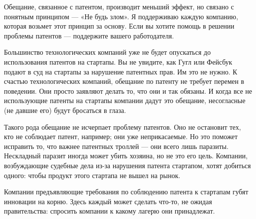 \documentclass[ebook,12pt,oneside,openany]{memoir}
\begin{document}
Обещание, связанное с патентом, производит меньший эффект, но связано
с понятным принципом — «Не будь злом». Я поддерживаю каждую компанию,
которая возьмет этот принцип за основу. Если вы хотите помощь в
решении проблемы патентов — поддержите вашего работодателя.

Большинство технологических компаний уже не будет опускаться до
использования патентов на стартапы. Вы не увидите, как Гугл или
Фейсбук подают в суд на стартапы за нарушение патентных прав. Им это
не нужно. К счастью технологических компаний, обещание по патенту не
требует перемен в поведении. Они просто заявляют делать то, что они и
так обязаны. И когда все не использующие патенты на стартапы компании
дадут это обещание, несогласные (не давшие его) будут бросаться в
глаза.

Такого рода обещание не исчерпает проблему патентов. Оно не остановит
тех, кто не соблюдает патент, например; они уже неприкасаемые. Но это
поможет исправить то, что важнее патентных троллей — они всего лишь
паразиты. Нескладный паразит иногда может убить хозяина, но не это его
цель. Компании, возбуждающие судебные дела из-за нарушения патента
стартапом, хотят добиться одного: чтобы продукт этого стартапа не
вышел на рынок.

Компании предъявляющие требования по соблюдению патента к стартапам
губят инновации на корню. Здесь каждый может сделать что-то, не ожидая
правительства: спросить компании к какому лагерю они принадлежат.
\end{document}
